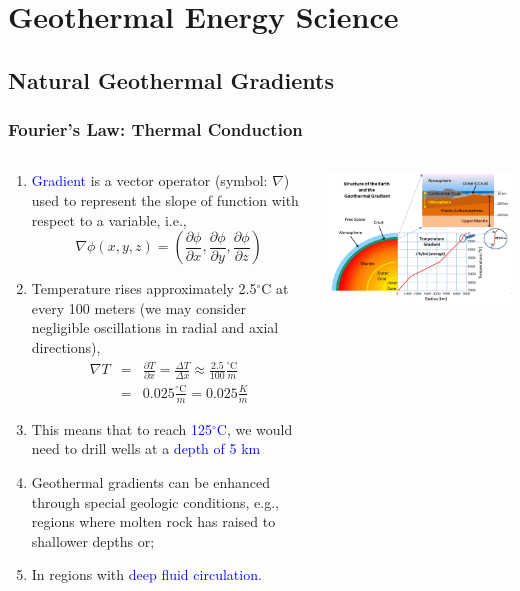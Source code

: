 \documentclass[10pt,compress]{beamer}
\newcommand{\frc}{\displaystyle\frac}
\newcommand{\blue}{\textcolor{blue}}
\begin{document}
 \section{Geothermal Energy Science}

\subsection{Natural Geothermal Gradients}

\begin{frame}
 \frametitle{Fourier's Law: Thermal Conduction}
  \begin{columns}
   \begin{column}[c]{0.45\linewidth}
    \begin{enumerate}[1.] \scriptsize
       \item <1-> \blue{Gradient} is a vector operator (symbol: $\nabla$) used to represent the slope of function with respect to a variable, i.e., 
          \begin{displaymath}
             \nabla \phi \left(x, y, z\right) = \left( \frc{\partial \phi}{\partial x}, \frc{\partial \phi}{\partial y}, \frc{\partial \phi}{\partial z}\right)
          \end{displaymath} 
       \item <2-> Temperature rises approximately 2.5$^{\circ}$C at every 100 meters (we may consider negligible oscillations in radial and axial directions),
          \begin{eqnarray}
             \nabla T  &=& \frc{\partial T}{\partial x} = \frc{\Delta T}{\Delta x} \approx \frc{2.5}{100} \frc{^{\circ}\text{C}}{m}  \nonumber \\
                       &=& 0.025 \frc{^{\circ}\text{C}}{m} = 0.025 \frc{K}{m} \nonumber
          \end{eqnarray} 
       \item <3-> This means that to reach \blue{125$^{\circ}$C}, we would need to drill wells at a \blue{depth of 5 km}
       \item <4-> Geothermal gradients can be enhanced through special geologic conditions, e.g., regions where molten rock has raised to shallower depths or;
       \item <4-> In regions with \blue{deep fluid circulation}.
    \end{enumerate}
   \end{column}
   \begin{column}[c]{0.55\linewidth}
     \vbox{
        \hbox{\hspace{1cm}\includegraphics[width=5.cm,clip]{./Pics/geothermal_gradient.png}}
}
\end{column}
\end{columns}
\end{frame}
\end{document}
